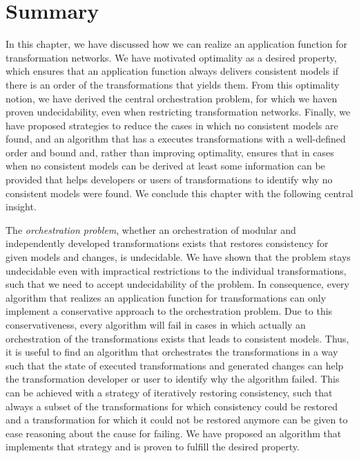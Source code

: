 \section{Summary}

In this chapter, we have discussed how we can realize an application function for transformation networks.
We have motivated optimality as a desired property, which ensures that an application function always delivers consistent models if there is an order of the transformations that yields them. 
From this optimality notion, we have derived the central orchestration problem, for which we haven proven undecidability, even when restricting transformation networks.
Finally, we have proposed strategies to reduce the cases in which no consistent models are found, and an algorithm that has a executes transformations with a well-defined order and bound and, rather than improving optimality, ensures that in cases when no consistent models can be derived at least some information can be provided that helps developers or users of transformations to identify why no consistent models were found.
We conclude this chapter with the following central insight.

\begin{insight}[Orchestration]
    The \emph{orchestration problem}, whether an orchestration of modular and independently developed transformations exists that restores consistency for given models and changes, is undecidable.
    We have shown that the problem stays undecidable even with impractical restrictions to the individual transformations, such that we need to accept undecidability of the problem.
    In consequence, every algorithm that realizes an application function for transformations can only implement a conservative approach to the orchestration problem.
    Due to this conservativeness, every algorithm will fail in cases in which actually an orchestration of the transformations exists that leads to consistent models.
    Thus, it is useful to find an algorithm that orchestrates the transformations in a way such that the state of executed transformations and generated changes can help the transformation developer or user to identify why the algorithm failed.
    This can be achieved with a strategy of iteratively restoring consistency, such that always a subset of the transformations for which consistency could be restored and a transformation for which it could not be restored anymore can be given to ease reasoning about the cause for failing.
    We have proposed an algorithm that implements that strategy and is proven to fulfill the desired property.
\end{insight}